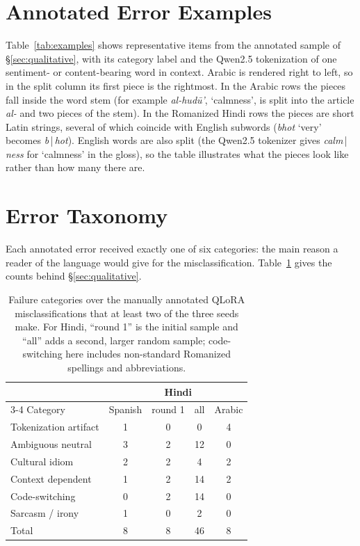 \documentclass[11pt]{article}
\begin{document}
\section{Annotated Error Examples}
\label{app:examples}

Table~\ref{tab:examples} shows representative items from the annotated sample of
\S\ref{sec:qualitative}, with its category label and the Qwen2.5
tokenization of one sentiment- or content-bearing word in context. Arabic is
rendered right to left, so in the split column its first piece is the rightmost.
In the Arabic rows the pieces fall inside the word stem (for example
\emph{al-hud\=u'}, `calmness', is split into the article \emph{al-} and two
pieces of the stem). In the Romanized Hindi rows the pieces are short Latin
strings, several of which coincide with English subwords (\emph{bhot} `very'
becomes \emph{b}\,|\,\emph{hot}). English words are also split (the Qwen2.5
tokenizer gives \emph{calm}\,|\,\emph{ness} for `calmness' in the gloss), so the
table illustrates what the pieces look like rather than how many there are.

\section{Error Taxonomy}
\label{app:errors}

Each annotated error received exactly one of six categories: the main reason a
reader of the language would give for the misclassification. Table~\ref{tab:errors}
gives the counts behind \S\ref{sec:qualitative}.

\begin{table}[H]
\centering\small
\setlength{\tabcolsep}{4pt}
\begin{tabular}{@{}lcccc@{}}
\toprule
& & \multicolumn{2}{c}{Hindi} & \\
\cmidrule(lr){3-4}
Category & Spanish & round 1 & all & Arabic \\
\midrule
Tokenization artifact & 1 & 0 & 0  & 4 \\
Ambiguous neutral     & 3 & 2 & 12 & 0 \\
Cultural idiom        & 2 & 2 & 4  & 2 \\
Context dependent     & 1 & 2 & 14 & 2 \\
Code-switching        & 0 & 2 & 14 & 0 \\
Sarcasm / irony       & 1 & 0 & 2  & 0 \\
\midrule
Total                 & 8 & 8 & 46 & 8 \\
\bottomrule
\end{tabular}
\caption{Failure categories over the manually annotated QLoRA misclassifications
that at least two of the three seeds make. For Hindi, ``round 1'' is the initial
sample and ``all'' adds a second, larger random sample; code-switching here
includes non-standard Romanized spellings and abbreviations.}
\label{tab:errors}
\end{table}
\end{document}
